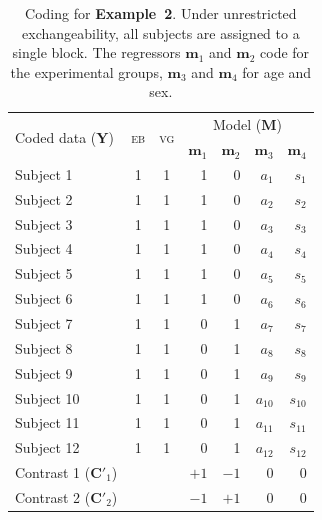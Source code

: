\begin{table}[!t]
\caption[Coding for Example 2]{Coding for \textbf{Example~2}. Under unrestricted exchangeability, all subjects are assigned to a single block. The regressors $\mathbf{m}_1$ and $\mathbf{m}_2$ code for the experimental groups, $\mathbf{m}_3$ and $\mathbf{m}_4$ for age and sex.}
\begin{center}
{\small
\begin{tabular}{@{}lccrrrr@{}}
\toprule
\multirow{2}{*}{\vspace*{-1.7mm}Coded data ($\mathbf{Y}$)} & \multirow{2}{*}{\vspace*{-1.7mm}\textsc{eb}} & \multirow{2}{*}{\vspace*{-1.7mm}\textsc{vg}} & \multicolumn{4}{c}{Model ($\mathbf{M}$)\hspace*{-3mm}}\\
\cmidrule(l){4-7}
& & & $\mathbf{m}_1$ & $\mathbf{m}_2$ & $\mathbf{m}_3$ & $\mathbf{m}_4$\\
\midrule
Subject 1   & 1 & 1 & 1 & 0 & $a_{1}$  & $s_{1}$\\
Subject 2   & 1 & 1 & 1 & 0 & $a_{2}$  & $s_{2}$\\
Subject 3   & 1 & 1 & 1 & 0 & $a_{3}$  & $s_{3}$\\
Subject 4   & 1 & 1 & 1 & 0 & $a_{4}$  & $s_{4}$\\
Subject 5   & 1 & 1 & 1 & 0 & $a_{5}$  & $s_{5}$\\
Subject 6   & 1 & 1 & 1 & 0 & $a_{6}$  & $s_{6}$\\
Subject 7   & 1 & 1 & 0 & 1 & $a_{7}$  & $s_{7}$\\
Subject 8   & 1 & 1 & 0 & 1 & $a_{8}$  & $s_{8}$\\
Subject 9   & 1 & 1 & 0 & 1 & $a_{9}$  & $s_{9}$\\
Subject 10  & 1 & 1 & 0 & 1 & $a_{10}$ & $s_{10}$\\
Subject 11  & 1 & 1 & 0 & 1 & $a_{11}$ & $s_{11}$\\
Subject 12  & 1 & 1 & 0 & 1 & $a_{12}$ & $s_{12}$\\
\midrule
Contrast 1 ($\mathbf{C}'_1$) & & & $+1$ & $-1$ & 0 & 0\\
Contrast 2 ($\mathbf{C}'_2$) & & & $-1$ & $+1$ & 0 & 0\\
\bottomrule
\end{tabular}}
\end{center}
\label{tab:perm:ex_multipleregression}
\end{table}

